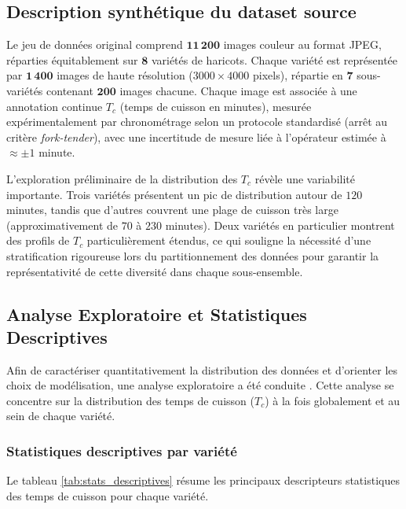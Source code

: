   \subsection{Description synthétique du dataset source}

  Le jeu de données original comprend \(\mathbf{11\,200}\) images couleur au format JPEG, réparties équitablement sur \(\mathbf{8}\) variétés de haricots. Chaque variété est représentée par \(\mathbf{1\,400}\) images de haute résolution (\(3000\times4000\) pixels), répartie en \(\mathbf{7}\) sous-variétés contenant \(\mathbf{200}\) images chacune. Chaque image est associée à une annotation continue \(T_c\) (temps de cuisson en minutes), mesurée expérimentalement par chronométrage selon un protocole standardisé (arrêt au critère \emph{fork-tender}), avec une incertitude de mesure liée à l'opérateur estimée à \(\approx\pm 1\) minute.

  L’exploration préliminaire de la distribution des $T_c$ révèle une variabilité importante. Trois variétés présentent un pic de distribution autour de $120$ minutes, tandis que d'autres couvrent une plage de cuisson très large (approximativement de $70$ à $230$ minutes). Deux variétés en particulier montrent des profils de $T_c$ particulièrement étendus, ce qui souligne la nécessité d'une stratification rigoureuse lors du partitionnement des données pour garantir la représentativité de cette diversité dans chaque sous-ensemble.


  \subsection{Analyse Exploratoire et Statistiques Descriptives}

  Afin de caractériser quantitativement la distribution des données et d'orienter les choix de modélisation, une analyse exploratoire a été conduite \citep{tukey1977exploratory}. Cette analyse se concentre sur la distribution des temps de cuisson ($T_c$) à la fois globalement et au sein de chaque variété.

  \subsubsection{Statistiques descriptives par variété}

  Le tableau \ref{tab:stats_descriptives} résume les principaux descripteurs statistiques des temps de cuisson pour chaque variété.

